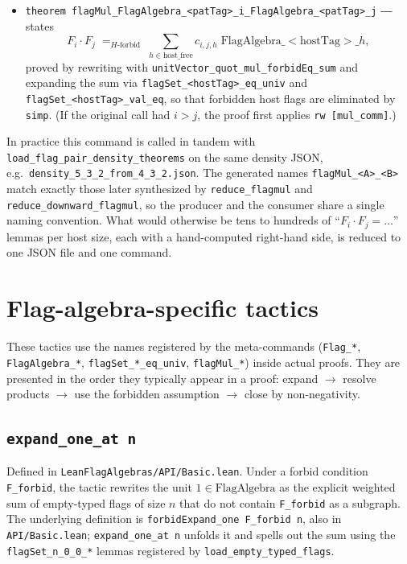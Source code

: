 \documentclass[11pt]{article}
\begin{document}
\begin{itemize}
  \item \texttt{theorem flagMul\_FlagAlgebra\_<patTag>\_i\_FlagAlgebra\_<patTag>\_j}
    ― states
    \[
       F_i \cdot F_j \;=_{H\text{-forbid}}\;
       \sum_{h \in \text{host\_free}} c_{i,j,h}\;
       \mathrm{FlagAlgebra}\_{<\!\!\mathrm{hostTag}\!\!>}\_h,
    \]
    proved by rewriting with
    \texttt{unitVector\_quot\_mul\_forbidEq\_sum} and expanding the sum
    via \texttt{flagSet\_<hostTag>\_eq\_univ} and
    \texttt{flagSet\_<hostTag>\_val\_eq}, so that forbidden host flags
    are eliminated by \texttt{simp}. (If the original call had $i > j$,
    the proof first applies \texttt{rw [mul\_comm]}.)
\end{itemize}

In practice this command is called in tandem with
\texttt{load\_flag\_pair\_density\_theorems} on the same density JSON,
e.g.\ \texttt{density\_5\_3\_2\_from\_4\_3\_2.json}. The generated
names \texttt{flagMul\_<A>\_<B>} match exactly those later synthesized
by \texttt{reduce\_flagmul} and \texttt{reduce\_downward\_flagmul}, so
the producer and the consumer share a single naming convention. What
would otherwise be tens to hundreds of ``$F_i \cdot F_j = \ldots$''
lemmas per host size, each with a hand-computed right-hand side, is
reduced to one JSON file and one command.

\section{Flag-algebra-specific tactics}

These tactics use the names registered by the meta-commands
(\texttt{Flag\_*}, \texttt{FlagAlgebra\_*}, \texttt{flagSet\_*\_eq\_univ},
\texttt{flagMul\_*}) inside actual proofs. They are presented in the
order they typically appear in a proof: expand $\to$ resolve products
$\to$ use the forbidden assumption $\to$ close by non-negativity.

\subsection{\texttt{expand\_one\_at n}}

Defined in \texttt{LeanFlagAlgebras/API/Basic.lean}. Under a forbid
condition \texttt{F\_forbid}, the tactic rewrites the unit
$1 \in \mathrm{FlagAlgebra}$ as the explicit weighted sum of
empty-typed flags of size $n$ that do not contain \texttt{F\_forbid} as
a subgraph. The underlying definition is
\texttt{forbidExpand\_one F\_forbid n}, also in
\texttt{API/Basic.lean}; \texttt{expand\_one\_at n} unfolds it and
spells out the sum using the \texttt{flagSet\_n\_0\_0\_*} lemmas
registered by \texttt{load\_empty\_typed\_flags}.
\end{document}
